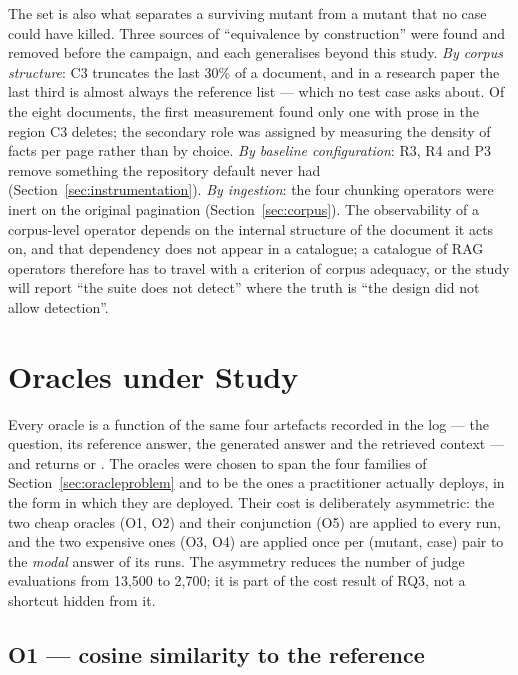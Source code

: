 \documentclass[a4paper,fleqn]{cas-dc}
\newcommand{\pass}{\mathrm{pass}}
\newcommand{\fail}{\mathrm{fail}}
\begin{document}
The set is also what separates a surviving mutant from a mutant that no case
could have killed. Three sources of ``equivalence by construction'' were found
and removed before the campaign, and each generalises beyond this study.
\emph{By corpus structure}: C3 truncates the last 30\% of a document, and in a
research paper the last third is almost always the reference list --- which no
test case asks about. Of the eight documents, the first measurement found only
one with prose in the region C3 deletes; the secondary role was assigned by
measuring the density of facts per page rather than by choice. \emph{By
baseline configuration}: R3, R4 and P3 remove something the repository default
never had (Section~\ref{sec:instrumentation}). \emph{By ingestion}: the four
chunking operators were inert on the original pagination
(Section~\ref{sec:corpus}). The observability of a corpus-level operator
depends on the internal structure of the document it acts on, and that
dependency does not appear in a catalogue; a catalogue of RAG operators
therefore has to travel with a criterion of corpus adequacy, or the study will
report ``the suite does not detect'' where the truth is ``the design did not
allow detection''.

\section{Oracles under Study}
\label{sec:oracles}

Every oracle is a function of the same four artefacts recorded in the log ---
the question, its reference answer, the generated answer and the retrieved
context --- and returns \pass{} or \fail{}. The oracles were chosen to span the
four families of Section~\ref{sec:oracleproblem} and to be the ones a
practitioner actually deploys, in the form in which they are deployed. Their
cost is deliberately asymmetric: the two cheap oracles (O1, O2) and their
conjunction (O5) are applied to every run, and the two expensive ones (O3, O4)
are applied once per (mutant, case) pair to the \emph{modal} answer of its
runs. The asymmetry reduces the number of judge evaluations from 13,500 to
2,700; it is part of the cost result of RQ3, not a shortcut hidden from it.

\subsection{O1 --- cosine similarity to the reference}
\label{sec:o1}
\end{document}
